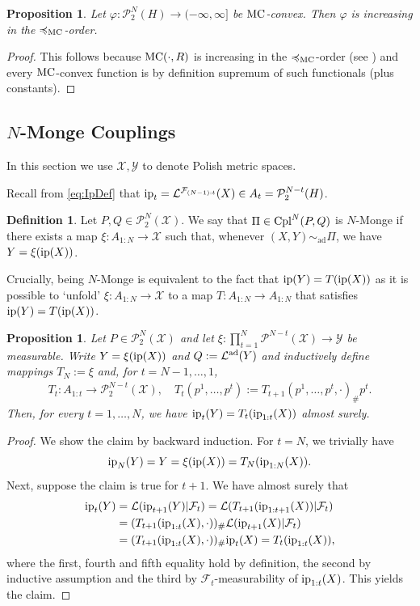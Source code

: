 \documentclass[a4paper]{amsart}
\numberwithin{theorem}{section}
\newtheorem{proposition}[theorem]{Proposition}
\theoremstyle{definition}
\newtheorem{definition}[theorem]{Definition}
\newcommand{\X}{\mathcal{X}}
\newcommand{\Xs}{\mathcal X}
\newcommand{\Ys}{\mathcal Y}
\newcommand{\F}{\mathcal{F}}
\newcommand{\law}{\mathcal{L}}
\newcommand{\cpl}{\textup{Cpl}}
\newcommand{\Pc}{\mathcal P}
\newcommand{\simad}{\sim_{\mathrm{ad}}}
\renewcommand{\H}{H}
\renewcommand{\phi}{\varphi}
\newcommand{\mc}{\textup{MC}}
\newcommand{\lemc}{\preccurlyeq_\mc}
\newcommand{\ip}{\textup{ip}}
\newcommand{\lawad}{\law^{\textup{ad}}}
\begin{document}
\begin{proposition}
Let $\phi : \Pc^N_2(\H) \to (-\infty, \infty]$ be $\mc$-convex. Then $\phi$ is increasing in the $\lemc$-order.    
\end{proposition}
\begin{proof}
    This follows because $\mc(\cdot, R)$ is increasing in the $\lemc$-order (see ) and every $\mc$-convex function is by definition supremum of such functionals (plus constants). 
\end{proof}



\subsection{$N$-Monge Couplings}\label{sec:NMonge}
In this section we use $\Xs, \Ys$ to denote Polish metric spaces.

Recall from \eqref{eq:IpDef} that $\ip_t= \law^{\F_{(N-1):t}}(X) \in     A_t = \Pc_2^{N-t}(\H)$. 
\begin{definition}
Let $P,Q \in \Pc_2^N(\X)$. We say that $\Pi \in \cpl^N(P,Q)$ is $N$-Monge if there exists a map $\xi : A_{1:N} \to \X$ such that, whenever $(X,Y) \simad \Pi$, we have $Y = \xi(\ip(X))$. 
\end{definition}
Crucially, being $N$-Monge is equivalent to the fact that $\ip(Y) = T(\ip(X))$ as it is possible to `unfold' $\xi: A_{1:N} \to \X$ to a map $T: A_{1:N} \to A_{1:N}$ that satisfies $\ip(Y) = T(\ip(X))$.





\begin{proposition} \label{prop:N-Monge.ip}
Let $P \in \Pc_2^N(\mathcal X)$ and let $\xi : \prod_{t=1}^N\Pc^{N-t}(\mathcal X) \to \mathcal Y$ be measurable. 
Write $Y = \xi(\ip(X))$ and $Q := \lawad(Y)$ and inductively define mappings $T_N := \xi$ and, for $t=N-1,\dots,1$,
\begin{align*}
   T_t : A_{1:t} \to \Pc_2^{N-t}(\X) ,\quad 
   T_t(p^1, \dots, p^t) := T_{t+1}(p^1, \dots, p^t, \cdot)_\# p^t.
\end{align*}
Then, for every $t = 1,\dots, N$, we have $\ip_t( Y)  = T_t(\ip_{1:t}(X))$ almost surely.
\end{proposition}


\begin{proof}
We show the claim by backward induction. 
For $t=N$, we trivially have 
$$\ip_N(Y) = Y = \xi(\ip(X)) = T_N(\ip_{1:N}(X)).$$ 
Next, suppose the claim is true for $t+1$.
We have almost surely that
\begin{align*}
    \ip_t(Y) &= \law(\ip_{t+1}(Y) | \F_t) = \law(T_{t+1}(\ip_{1:t+1}(X)) | \F_t)
    \\
    &= (T_{t+1}(\ip_{1:t}(X),\cdot))_\# \law(\ip_{t+1}(X) | \F_t)
    \\
    &= (T_{t+1}(\ip_{1:t}(X),\cdot))_\# \ip_t(X) = T_t(\ip_{1:t}(X)),
\end{align*}
where the first, fourth and fifth equality hold by definition, the second by inductive assumption and the third by $\F_t$-measurability of $\ip_{1:t}(X)$.
This yields the claim.
\end{proof}
\end{document}
